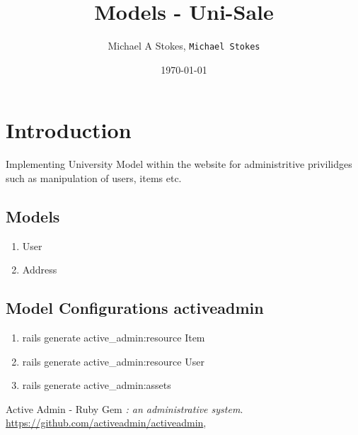 \documentclass[11pt]{article}
\title{Models - Uni-Sale}
\author{Michael A Stokes, \texttt{Michael Stokes}}
\date{\today}
\begin{document}
\maketitle

\section{Introduction}
Implementing University Model within the website for administritive
privilidges such as manipulation of users, items etc.

\subsection{Models}

\begin{enumerate}
\item User
\item Address
\end{enumerate}

\subsection{Model Configurations activeadmin}
\begin{enumerate}
\item rails generate active\_admin:resource Item
\item rails generate active\_admin:resource User
\item rails generate active\_admin:assets
\end{enumerate}

\begin{thebibliography}{9}

  Active Admin - Ruby Gem
  \emph{: an administrative system}.
  {\url{https://github.com/activeadmin/activeadmin}},
\end{thebibliography}
\end{document}
